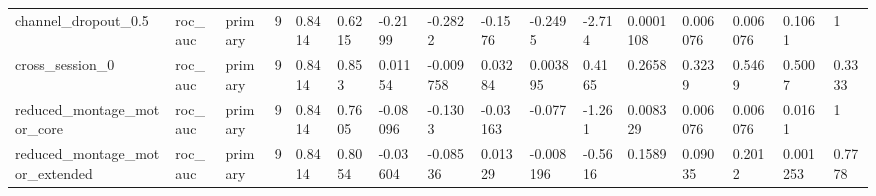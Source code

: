 \begin{tabular}{llllllllllllllll}
channel\_dropout\_0.5 & roc\_auc & primary & 9 & 0.8414 & 0.6215 & -0.2199 & -0.2822 & -0.1576 & -0.2495 & -2.714 & 0.0001108 & 0.006076 & 0.006076 & 0.1061 & 1 \\
cross\_session\_0 & roc\_auc & primary & 9 & 0.8414 & 0.853 & 0.01154 & -0.009758 & 0.03284 & 0.003895 & 0.4165 & 0.2658 & 0.3239 & 0.5469 & 0.5007 & 0.3333 \\
reduced\_montage\_motor\_core & roc\_auc & primary & 9 & 0.8414 & 0.7605 & -0.08096 & -0.1303 & -0.03163 & -0.077 & -1.261 & 0.008329 & 0.006076 & 0.006076 & 0.0161 & 1 \\
reduced\_montage\_motor\_extended & roc\_auc & primary & 9 & 0.8414 & 0.8054 & -0.03604 & -0.08536 & 0.01329 & -0.008196 & -0.5616 & 0.1589 & 0.09035 & 0.2012 & 0.001253 & 0.7778 \\
\bottomrule
\end{tabular}
